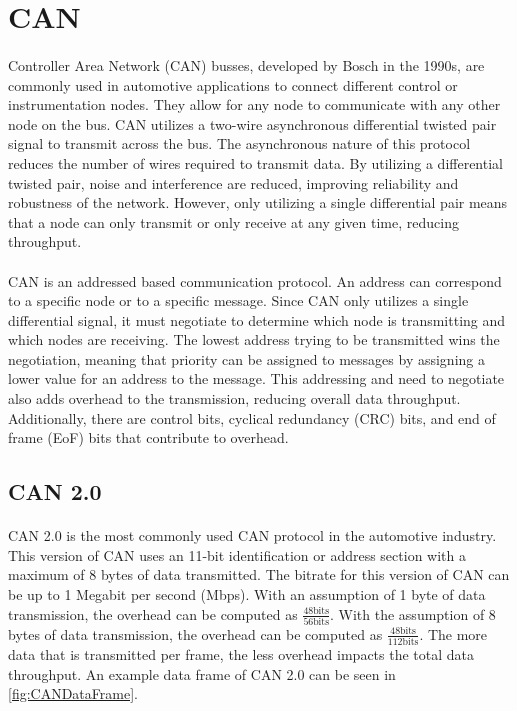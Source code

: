 \section{CAN}

\paragraph{}
Controller Area Network (CAN) \cite{wikipediaCAN} busses, developed by Bosch in the 1990s, are commonly used in automotive applications to connect different control or instrumentation nodes.
They allow for any node to communicate with any other node on the bus.
CAN utilizes a two-wire asynchronous differential twisted pair signal to transmit across the bus.
The asynchronous nature of this protocol reduces the number of wires required to transmit data.
By utilizing a differential twisted pair, noise and interference are reduced, improving reliability and robustness of the network.
However, only utilizing a single differential pair means that a node can only transmit or only receive at any given time, reducing throughput.

\paragraph{}
CAN is an addressed based communication protocol.
An address can correspond to a specific node or to a specific message.
Since CAN only utilizes a single differential signal, it must negotiate to determine which node is transmitting and which nodes are receiving.
The lowest address trying to be transmitted wins the negotiation, meaning that priority can be assigned to messages by assigning a lower value for an address to the message.
This addressing and need to negotiate also adds overhead to the transmission, reducing overall data throughput.
Additionally, there are control bits, cyclical redundancy (CRC) bits, and end of frame (EoF) bits that contribute to overhead.

\subsection{CAN 2.0}

\paragraph{}
CAN 2.0 \cite{BOSCH_CAN20} is the most commonly used CAN protocol in the automotive industry.
This version of CAN uses an 11-bit identification or address section with a maximum of 8 bytes of data transmitted.
The bitrate for this version of CAN can be up to 1 Megabit per second (Mbps).
With an assumption of 1 byte of data transmission, the overhead can be computed as $\frac{48 \text{bits}}{56 \text{bits}}$.  With the assumption of 8 bytes of data transmission, the overhead can be computed as $\frac{48 \text{bits}}{112 \text{bits}}$.
The more data that is transmitted per frame, the less overhead impacts the total data throughput.
An example data frame of CAN 2.0 can be seen in \cref{fig:CANDataFrame}.


